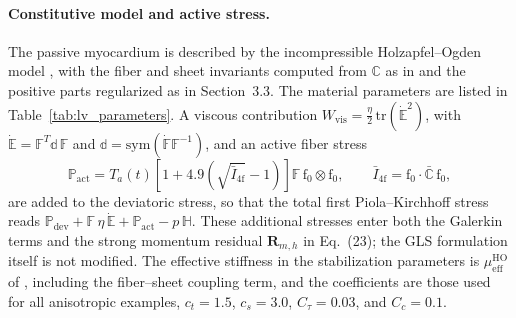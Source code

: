 \paragraph{Constitutive model and active stress.}
The passive myocardium is described by the incompressible Holzapfel--Ogden model
, with the fiber and sheet invariants computed from $\mathbb{C}$ as in
 and the positive parts regularized as in Section~3.3. The material parameters are
listed in Table~\ref{tab:lv_parameters}. A viscous contribution
$W_{\mathrm{vis}}=\tfrac{\eta}{2}\,\mathrm{tr}(\dot{\mathbb{E}}^2)$, with
$\dot{\mathbb{E}}=\mathbb{F}^T\mathbb{d}\,\mathbb{F}$ and
$\mathbb{d}=\mathrm{sym}(\dot{\mathbb{F}}\mathbb{F}^{-1})$, and an active fiber stress
\begin{equation}
  \mathbb{P}_{\mathrm{act}} = T_a(t)\left[1+4.9\left(\sqrt{\bar I_{4\mathrm{f}}}-1\right)\right]
  \mathbb{F}\,\mathrm{f}_0\otimes\mathrm{f}_0,
  \qquad \bar I_{4\mathrm{f}}=\mathrm{f}_0\cdot\bar{\mathbb{C}}\,\mathrm{f}_0,
  \label{eq:lv_active}
\end{equation}
are added to the deviatoric stress, so that the total first Piola--Kirchhoff stress reads
$\mathbb{P}_{\mathrm{dev}}+\mathbb{F}\,\eta\,\dot{\mathbb{E}}+\mathbb{P}_{\mathrm{act}}-p\,\mathbb{H}$.
These additional stresses enter both the Galerkin terms and the strong momentum residual
$\mathbf{R}_{m,h}$ in Eq.~(23); the GLS formulation itself is not modified. The effective
stiffness in the stabilization parameters is $\mu_{\mathrm{eff}}^{\mathrm{HO}}$ of
, including the fiber--sheet coupling term, and the coefficients are those used
for all anisotropic examples, $c_t=1.5$, $c_s=3.0$, $C_\tau=0.03$, and $C_c=0.1$.

